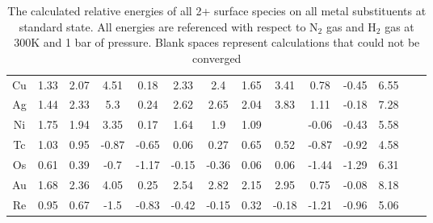 \documentclass[journal=jacsat,manuscript=article]{achemso}
\begin{document}
\begin{table}
\begin{center}
\begin{tabular}{| c | c | c | c | c | c | c | c | c | c | c | c | c | c |}
Cu & 1.33 & 2.07 & 4.51 & 0.18 & 2.33 & 2.4 & 1.65 & 3.41 & 0.78 & -0.45 & 6.55 \\
Ag & 1.44 & 2.33 & 5.3 & 0.24 & 2.62 & 2.65 & 2.04 & 3.83 & 1.11 & -0.18 & 7.28 \\
Ni & 1.75 & 1.94 & 3.35 & 0.17 & 1.64 & 1.9 & 1.09 &  & -0.06 & -0.43 & 5.58 \\
Tc & 1.03 & 0.95 & -0.87 & -0.65 & 0.06 & 0.27 & 0.65 & 0.52 & -0.87 & -0.92 & 4.58 \\
Os & 0.61 & 0.39 & -0.7 & -1.17 & -0.15 & -0.36 & 0.06 & 0.06 & -1.44 & -1.29 & 6.31 \\
Au & 1.68 & 2.36 & 4.05 & 0.25 & 2.54 & 2.82 & 2.15 & 2.95 & 0.75 & -0.08 & 8.18 \\
Re & 0.95 & 0.67 & -1.5 & -0.83 & -0.42 & -0.15 & 0.32 & -0.18 & -1.21 & -0.96 & 5.06 \\
\hline
\end{tabular}
\end{center}
\caption{The calculated relative energies of all 2+ surface species on all metal substituents at standard state. All energies are referenced with respect to N$_2$ gas and H$_2$ gas at 300K and 1 bar of pressure. Blank spaces represent calculations that could not be converged}
\label{table:energies}
\end{table}
\end{document}
